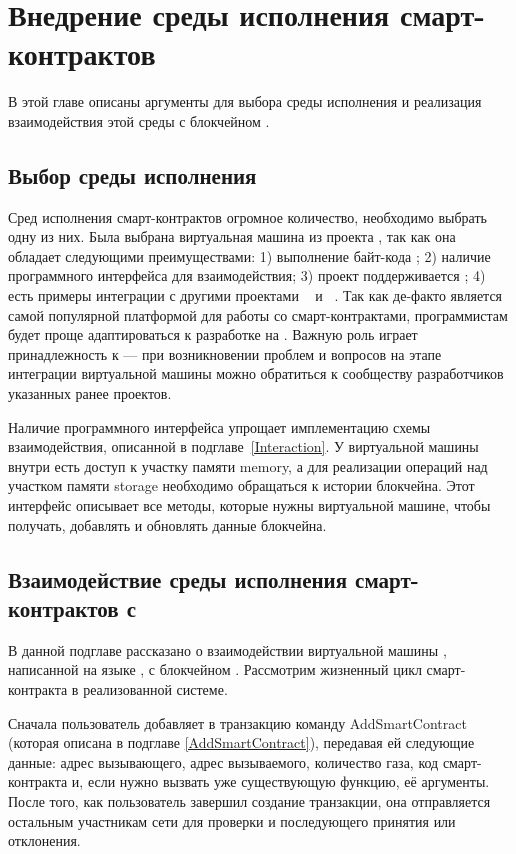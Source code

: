 \section{Внедрение среды исполнения смарт-кон\-трак\-тов}
В этой главе описаны аргументы для выбора среды исполнения и реализация взаимодействия этой среды с блокчейном .

\subsection{Выбор среды исполнения}
Сред исполнения смарт-контрактов огромное количество, необходимо выбрать одну из них.
Была выбрана виртуальная машина из проекта , так как она обладает следующими преимуществами: 1) выполнение байт-кода ; 2) наличие программного интерфейса для взаимодействия; 3) проект поддерживается ; 4) есть примеры интеграции с другими проектами ~\cite{HLFabricEVM} и ~\cite{HLSeth}.
Так как  де-факто является самой популярной платформой для работы со смарт-контрактами, программистам будет проще адаптироваться к разработке на .
Важную роль играет принадлежность к  --- при возникновении проблем и вопросов на этапе интеграции виртуальной машины можно обратиться к сообществу разработчиков указанных ранее проектов.

Наличие программного интерфейса упрощает имплементацию схемы взаимодействия, описанной в подглаве~\ref{Interaction}.
У виртуальной машины внутри есть доступ к участку памяти memory, а для реализации операций над участком памяти storage необходимо обращаться к истории блокчейна.
Этот интерфейс описывает все методы, которые нужны виртуальной машине, чтобы получать, добавлять и обновлять данные блокчейна.


\subsection{Взаимодействие среды исполнения смарт-кон\-трак\-тов с }
В данной подглаве рассказано о взаимодействии виртуальной машины , написанной на языке , с блокчейном . 
Рассмотрим жизненный цикл смарт-контракта в реализованной системе.

Сначала пользователь добавляет в транзакцию команду Add\-Smart\-Con\-tract (которая описана в подглаве \ref{AddSmartContract}), передавая ей следующие данные: адрес вызывающего, адрес вызываемого, количество газа, код смарт-кон\-тракта и, если нужно вызвать уже существующую функцию, её аргументы.
После того, как пользователь завершил создание транзакции, она отправляется остальным участникам сети для проверки и последующего принятия или отклонения.

